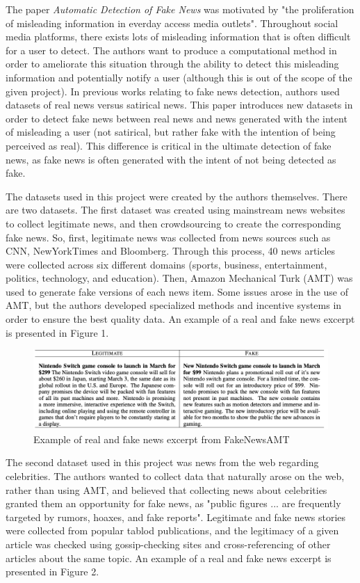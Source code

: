 \documentclass{article}
\begin{document}
The paper \emph{Automatic Detection of Fake News} was motivated by "the proliferation of misleading information in everday access media outlets". Throughout social media platforms, there exists lots of misleading information that is often difficult for a user to detect. The authors want to produce a computational method in order to ameliorate this situation through the ability to detect this misleading information and potentially notify a user (although this is out of the scope of the given project). In previous works relating to fake news detection, authors used datasets of real news versus satirical news. This paper introduces new datasets in order to detect fake news between real news and news generated with the intent of misleading a user (not satirical, but rather fake with the intention of being perceived as real). This difference is critical in the ultimate detection of fake news, as fake news is often generated with the intent of not being detected as fake.

The datasets used in this project were created by the authors themselves. There are two datasets. The first dataset was created using mainstream news websites to collect legitimate news, and then crowdsourcing to create the corresponding fake news. So, first, legitimate news was collected from news sources such as CNN, NewYorkTimes and Bloomberg. Through this process, 40 news articles were collected across six different domains (sports, business, entertainment, politics, technology, and education). Then, Amazon Mechanical Turk (AMT) was used to generate fake versions of each news item. Some issues arose in the use of AMT, but the authors developed specialized methods and incentive systems in order to ensure the best quality data. An example of a real and fake news excerpt is presented in Figure 1.
\begin{figure}[] 
  \includegraphics[width=\textwidth]{Results_For_Paper/FakeNewsAMT.png}
  \caption{Example of real and fake news excerpt from FakeNewsAMT}
\end{figure}

The second dataset used in this project was news from the web regarding celebrities. The authors wanted to collect data that naturally arose on the web, rather than using AMT, and believed that collecting news about celebrities granted them an opportunity for fake news, as "public figures ... are frequently targeted by rumors, hoaxes, and fake reports". Legitimate and fake news stories were collected from popular tablod publications, and the legitimacy of a given article was checked using gossip-checking sites and cross-referencing of other articles about the same topic. An example of a real and fake news excerpt is presented in Figure 2.
\end{document}
